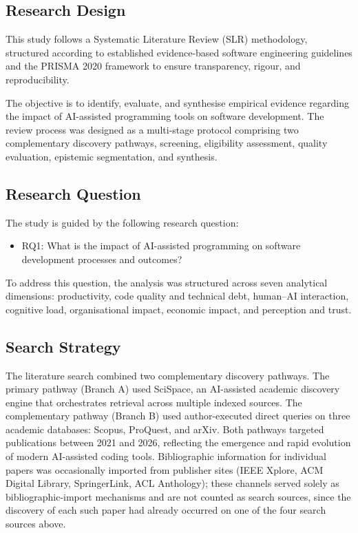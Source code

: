 \subsection{Research Design}
\label{sec:research-design}
This study follows a Systematic Literature Review (SLR) methodology, structured according to established evidence-based software engineering guidelines \cite{kitchenham_guidelines_2007} and the PRISMA 2020 framework \cite{page_prisma_2021} to ensure transparency, rigour, and reproducibility.

The objective is to identify, evaluate, and synthesise empirical evidence regarding the impact of AI-assisted programming tools on software development. The review process was designed as a multi-stage protocol comprising two complementary discovery pathways, screening, eligibility assessment, quality evaluation, epistemic segmentation, and synthesis.

\subsection{Research Question}
\label{sec:research-question}
The study is guided by the following research question:

\begin{itemize}
    \item RQ1: What is the impact of AI-assisted programming on software development processes and outcomes?
\end{itemize}

To address this question, the analysis was structured across seven analytical dimensions: productivity, code quality and technical debt, human--AI interaction, cognitive load, organisational impact, economic impact, and perception and trust.

\subsection{Search Strategy}
\label{sec:search-strategy}
The literature search combined two complementary discovery pathways. The primary pathway (Branch A) used SciSpace, an AI-assisted academic discovery engine that orchestrates retrieval across multiple indexed sources. The complementary pathway (Branch B) used author-executed direct queries on three academic databases: Scopus, ProQuest, and arXiv. Both pathways targeted publications between 2021 and 2026, reflecting the emergence and rapid evolution of modern AI-assisted coding tools. Bibliographic information for individual papers was occasionally imported from publisher sites (IEEE Xplore, ACM Digital Library, SpringerLink, ACL Anthology); these channels served solely as bibliographic-import mechanisms and are not counted as search sources, since the discovery of each such paper had already occurred on one of the four search sources above.


